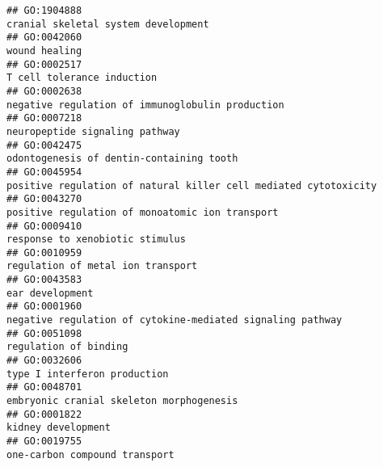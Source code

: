 \documentclass[
]{article}
\begin{document}
\begin{verbatim}
## GO:1904888                                                                                                              cranial skeletal system development
## GO:0042060                                                                                                                                    wound healing
## GO:0002517                                                                                                                       T cell tolerance induction
## GO:0002638                                                                                                 negative regulation of immunoglobulin production
## GO:0007218                                                                                                                   neuropeptide signaling pathway
## GO:0042475                                                                                                         odontogenesis of dentin-containing tooth
## GO:0045954                                                                                 positive regulation of natural killer cell mediated cytotoxicity
## GO:0043270                                                                                                  positive regulation of monoatomic ion transport
## GO:0009410                                                                                                                  response to xenobiotic stimulus
## GO:0010959                                                                                                                regulation of metal ion transport
## GO:0043583                                                                                                                                  ear development
## GO:0001960                                                                                       negative regulation of cytokine-mediated signaling pathway
## GO:0051098                                                                                                                            regulation of binding
## GO:0032606                                                                                                                     type I interferon production
## GO:0048701                                                                                                         embryonic cranial skeleton morphogenesis
## GO:0001822                                                                                                                               kidney development
## GO:0019755                                                                                                                    one-carbon compound transport

\end{verbatim}
\end{document}
